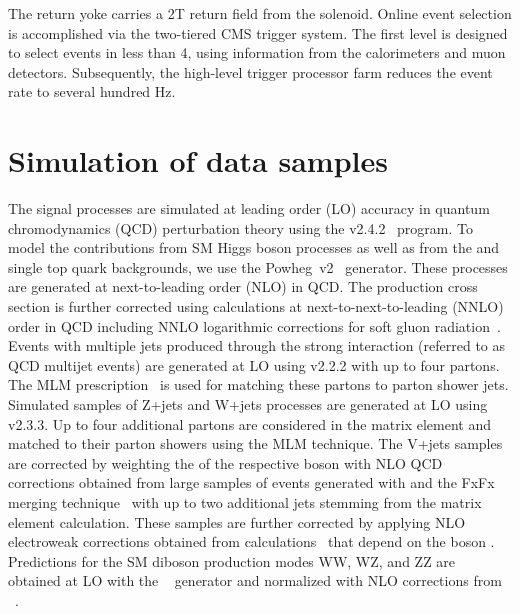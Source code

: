 %                                                                                                                                                                                                    
The return yoke carries a 2\unit{T} return field from the solenoid.
%                                                                                                                                                                                                    
Online event selection is accomplished via the two-tiered CMS trigger
system. The first level is designed to select events in less than
4\mus, using information from the calorimeters and muon detectors.
%                                                                                                                                                                                                    
Subsequently, the high-level trigger processor farm reduces the event rate to several hundred Hz.


\section{Simulation of data samples}

The signal processes are simulated at leading order (LO) accuracy in quantum chromodynamics (QCD) perturbation theory using the  v2.4.2~\cite{amcatnlo} program.
%
To model the contributions from SM Higgs boson processes as well as
from the \ttbar and single top quark backgrounds, we use the {\sc Powheg~v2}~\cite{Nason:2004rx,Frixione:2007vw,Alioli:2010xd} generator. These processes are generated at next-to-leading order (NLO) in QCD. The \ttbar production 
cross section is further corrected using calculations at 
next-to-next-to-leading (NNLO) order in QCD including NNLO logarithmic corrections for soft gluon radiation~\cite{ttbarNNLO}. 
% 
Events with multiple jets produced through the strong interaction (referred to as QCD multijet events) are generated at LO using  v2.2.2 with up to four partons. The MLM prescription~\cite{mlm} is used for matching these partons to parton shower jets.
%
Simulated samples of Z+jets and W+jets processes are generated at LO using  v2.3.3. Up to four additional partons are considered in the matrix element and matched to their parton showers using the MLM technique.
%
The V+jets samples are corrected by weighting the \pt of the respective boson with NLO QCD corrections obtained from large samples of events generated with  and the FxFx merging technique~\cite{fxfx} with up to two additional jets stemming from the matrix element calculation.
%
These samples are further corrected by applying NLO electroweak corrections obtained from calculations~\cite{Kuhn:2005gv,Kallweit:2015fta,Kallweit:2015dum} that depend on the boson \pt.
%
Predictions for the SM diboson production modes WW, WZ, and ZZ are obtained at LO with the {\sc {}}~\cite{Sjostrand:2014zea} generator and normalized with NLO corrections from \MCFM~\cite{MCFM}. 
%


